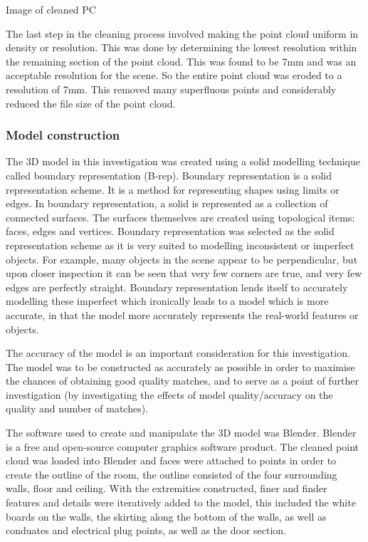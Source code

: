 \documentclass[11pt,a4paper]{report}
\begin{document}
				{{Image of cleaned PC}}
 
				The last step in the cleaning process involved making the point cloud uniform in density or resolution. This was done by determining the lowest resolution within the remaining section of the point cloud. This was found to be 7mm and was an acceptable resolution for the scene. So the entire point cloud was eroded to a resolution of 7mm. This removed many superfluous points and considerably reduced the file size of the point cloud.
			
			\subsubsection{Model construction}
				The 3D model in this investigation was created using a solid modelling technique called boundary representation (B-rep). Boundary representation is a solid representation scheme. It is a method for representing shapes using limits or edges. In boundary representation, a solid is represented as a collection of connected surfaces. The surfaces themselves are created using topological items: faces, edges and vertices.
				\cite{hongxin_zhang_introduction_2007}
				Boundary representation was selected as the solid representation scheme as it is very suited to modelling inconsistent or imperfect objects. For example, many objects in the scene appear to be perpendicular, but upon closer inspection it can be seen that very few corners are true, and very few edges are perfectly straight. Boundary representation lends itself to accurately modelling these imperfect which ironically leads to a model which is more accurate, in that the model more accurately represents the real-world features or objects.
				
				The accuracy of the model is an important consideration for this investigation. The model was to be constructed as accurately as possible in order to maximise the chances of obtaining good quality matches, and to serve as a point of further investigation (by investigating the effects of model quality/accuracy on the quality and number of matches).
				
				The software used to create and manipulate the 3D model was Blender. Blender is a free and open-source computer graphics software product. The cleaned point cloud was loaded into Blender and faces were attached to points in order to create the outline of the room, the outline consisted of the four surrounding walls, floor and ceiling. With the extremities constructed, finer and finder features and details were iteratively added to the model, this included the white boards on the walls, the skirting along the bottom of the walls, as well as conduates and electrical plug points, as well as the door section.
				
\end{document}
